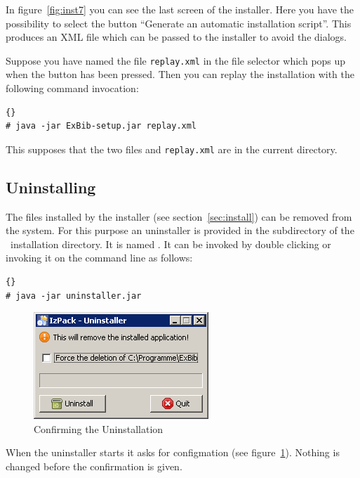 In figure~\ref{fig:inst7} you can see the last screen of the
installer. Here you have the possibility to select the button
``Generate an automatic installation script''. This produces an XML
file which can be passed to the installer to avoid the
dialogs.

Suppose you have named the file \texttt{replay.xml} in the file
selector which pops up when the button has been pressed. Then you can
replay the installation with the following command invocation:

\begin{lstlisting}{}
# java -jar ExBib-setup.jar replay.xml
\end{lstlisting}

This supposes that the two files  and
\texttt{replay.xml} are in the current directory.

\subsection{Uninstalling \ExBib}\label{sec:uninst}

The files installed by the installer (see section~\ref{sec:install})
can be removed from the system. For this purpose an uninstaller is
provided in the subdirectory  of the \ExBib\
installation directory. It is named . It can be
invoked by double clicking or invoking it on the command line as follows:

\begin{lstlisting}{}
# java -jar uninstaller.jar
\end{lstlisting}

\begin{figure}[!h]
  \centering
  \includegraphics[width=.45\textwidth]{img/uninst1}
  \caption{Confirming the Uninstallation}
  \label{fig:uninst1}
\end{figure}

When the uninstaller starts it asks for configmation (see
figure~\ref{fig:uninst1}). Nothing is changed before the confirmation
is given.

